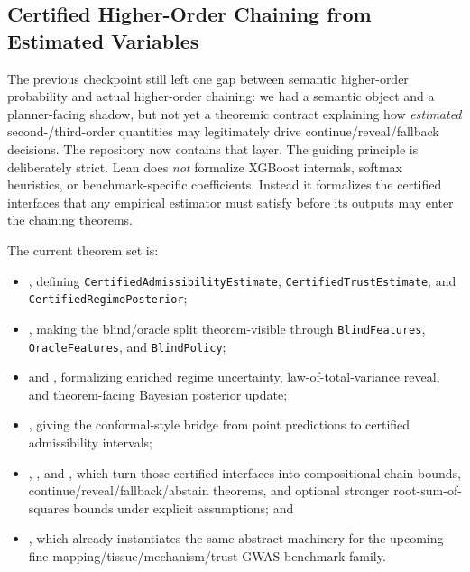 \documentclass[11pt,openany]{report}
\begin{document}
\subsection{Certified Higher-Order Chaining from Estimated Variables}

The previous checkpoint still left one gap between semantic higher-order
probability and actual higher-order chaining: we had a semantic object and a
planner-facing shadow, but not yet a theoremic contract explaining how
\emph{estimated} second-/third-order quantities may legitimately drive
continue/reveal/fallback decisions.  The repository now contains that layer.
The guiding principle is deliberately strict.  Lean does \emph{not} formalize
XGBoost internals, softmax heuristics, or benchmark-specific coefficients.
Instead it formalizes the certified interfaces that any empirical estimator
must satisfy before its outputs may enter the chaining theorems.

The current theorem set is:
\begin{itemize}
\item {},
  defining \texttt{CertifiedAdmissibilityEstimate},
  \texttt{CertifiedTrustEstimate}, and
  \texttt{CertifiedRegimePosterior};
\item {},
  making the blind/oracle split theorem-visible through
  \texttt{BlindFeatures}, \texttt{OracleFeatures}, and
  \texttt{BlindPolicy};
\item {} and
  ,
  formalizing enriched regime uncertainty, law-of-total-variance reveal, and
  theorem-facing Bayesian posterior update;
\item {},
  giving the conformal-style bridge from point predictions to certified
  admissibility intervals;
\item {},
  , and
  ,
  which turn those certified interfaces into compositional chain bounds,
  continue/reveal/fallback/abstain theorems, and optional stronger
  root-sum-of-squares bounds under explicit assumptions; and
\item {}, which already
  instantiates the same abstract machinery for the upcoming
  fine-mapping/tissue/mechanism/trust GWAS benchmark family.
\end{itemize}
\end{document}
